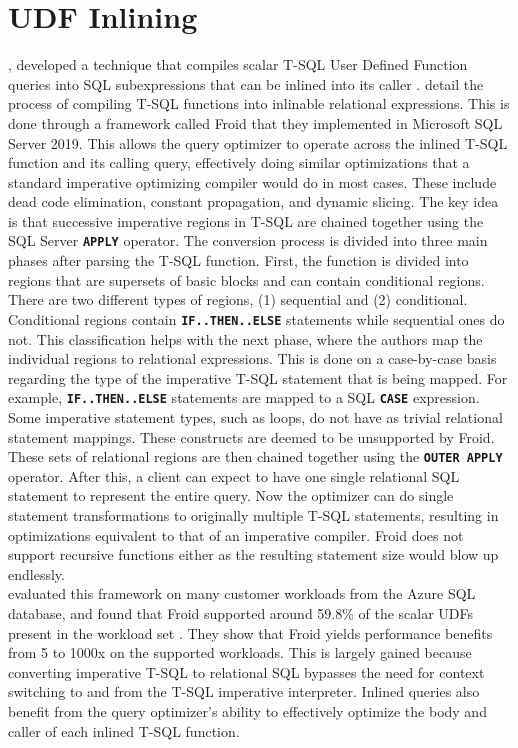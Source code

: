 \documentclass[12pt]{cmuthesis}
\newcommand{\dbSQL}[1]{\texttt{\textbf{#1}}\xspace}
\begin{document}
        \section{UDF Inlining}
        \label{sec:relinling}
        \citeauthor{ramachandra19}, developed a technique that compiles scalar T-SQL User Defined Function queries into SQL subexpressions that can be inlined into its caller \cite{ramachandra19}. \citeauthor{ramachandra19} detail the process of compiling T-SQL functions into inlinable relational expressions. This is done through a framework called Froid that they implemented in Microsoft SQL Server 2019. This allows the query optimizer to operate across the inlined T-SQL function and its calling query, effectively doing similar optimizations that a standard imperative optimizing compiler would do in most cases. These include dead code elimination, constant propagation, and dynamic slicing. The key idea is that successive imperative regions in T-SQL are chained together using the SQL Server \dbSQL{APPLY} operator. The conversion process is divided into three main phases after parsing the T-SQL function. First, the function is divided into regions that are supersets of basic blocks and can contain conditional regions. There are two different types of regions, (1) sequential and (2) conditional. Conditional regions contain \dbSQL{IF..THEN..ELSE} statements while sequential ones do not. This classification helps with the next phase, where the authors map the individual regions to relational expressions. This is done on a case-by-case basis regarding the type of the imperative T-SQL statement that is being mapped. For example, \dbSQL{IF..THEN..ELSE} statements are mapped to a SQL \dbSQL{CASE} expression. Some imperative statement types, such as loops, do not have as trivial relational statement mappings. These constructs are deemed to be unsupported by Froid. These sets of relational regions are then chained together using the \dbSQL{OUTER APPLY} operator. After this, a client can expect to have one single relational SQL statement to represent the entire query. Now the optimizer can do single statement transformations to originally multiple T-SQL statements, resulting in optimizations equivalent to that of an imperative compiler. Froid does not support recursive functions either as the resulting statement size would blow up endlessly.\\
        
        \citeauthor{ramtech} evaluated this framework on many customer workloads from the Azure SQL database, and found that Froid supported around 59.8\% of the scalar UDFs present in the workload set \cite{ramtech}. They show that Froid yields performance benefits from 5 to 1000x on the supported workloads. This is largely gained because converting imperative T-SQL to relational SQL bypasses the need for context switching to and from the T-SQL imperative interpreter. Inlined queries also benefit from the query optimizer's ability to effectively  optimize the body and caller of each inlined T-SQL function. \\
\end{document}
